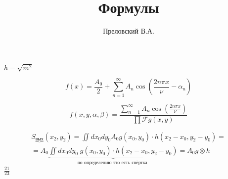 \documentclass[12pt,a4paper]{article}
\author{Преловский В.А.}
\title{Формулы}
\begin{document}
	{\Huge $h=\sqrt{{m}^{2}}$}
	
	{\Huge
		
	 \begin{equation}\label{eq:fourierrow}
	 	f(x) = \frac{A_0}{2} + \sum \limits_{n=1}^{\infty} A_n \cos \left( \frac{2 n \pi x}{\nu}-\alpha_n \right) 
	 \end{equation}
 
	 \begin{equation} 
	 	f(x,y,\alpha, \beta) = \frac{\sum \limits_{n=1}^{\infty} 
	 		A_n \cos \left( \frac{2 n \pi x}{\nu} \right)} {\prod \mathcal{F} {g(x,y)} } 
	 \end{equation}
 
	 \begin{eqnarray} S_{\underbrace{вых}}(x_2, y_2) = \iint dx_0 dy_0 A_0 g(x_0, y_0) \cdot h(x_2-x_0, y_2 -y_0) = \\
	 	= A_0 \underbrace{\iint dx_0 dy_0 \; g(x_0, y_0) 
	 		\cdot h(x_2-x_0, y_2 -y_0)}_{\text{по определению это есть свёртка }} = A_0 g \otimes h 
	 \end{eqnarray}
	$\frac{21}{23}$
	
}
\end{document}

